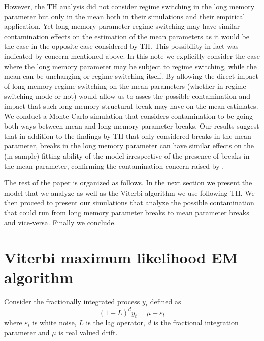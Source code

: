\documentclass[11pt,fleqn]{article}
\begin{document}
However, the TH analysis did not consider regime switching in the
long memory parameter but only in the mean both in their simulations and
their empirical application. Yet long memory parameter regime switching may
have similar contamination effects on the estimation of the mean parameters
as it would be the case in the opposite case considered by TH. This
possibility in fact was indicated by \cite{Diebold2001} concern mentioned
above. In this note we explicitly consider the case where the long memory
parameter may be subject to regime switching, while the mean can be
unchanging or regime switching itself. By allowing the direct impact of long
memory regime switching on the mean parameters (whether in regime switching
mode or not) would allow us to asses the possible contamination and impact
that such long memory structural break may have on the mean estimates. We
conduct a Monte Carlo simulation that considers contamination to be going
both ways between mean and long memory parameter breaks. Our results suggest
that in addition to the findings by TH that only considered breaks in the
mean parameter, breaks in the long memory parameter can have similar effects
on the (in sample) fitting ability of the model irrespective of the presence
of breaks in the mean parameter, confirming the contamination concern raised
by \cite{Diebold2001}.

The rest of the paper is organized as follows. In the next section we
present the model that we analyze as well as the Viterbi algorithm we use following
TH. We then proceed to present our simulations that analyze the possible
contamination that could run from long memory parameter breaks to mean
parameter breaks and vice-versa. Finally we conclude.

\section{Viterbi maximum likelihood EM algorithm}

Consider the fractionally integrated process $y_{t}$ defined as 
\begin{equation}
\left( 1-L\right) ^{d}y_{t}=\mu +\varepsilon _{t}  \label{eq:fi}
\end{equation}%
where $\varepsilon _{t}$ is white noise, $L$ is the lag operator, $d$ is the
fractional integration parameter and $\mu $ is real valued drift.
\end{document}
